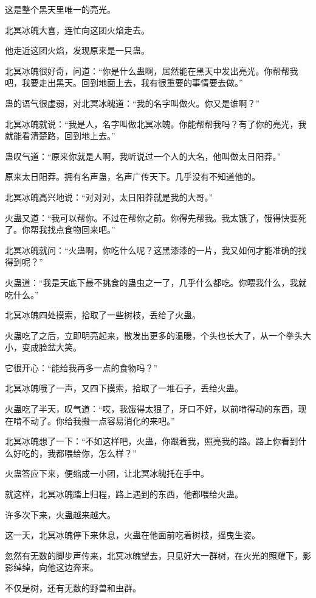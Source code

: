 \begin{this_body}
这是整个黑天里唯一的亮光。

北冥冰魄大喜，连忙向这团火焰走去。

他走近这团火焰，发现原来是一只蛊。

北冥冰魄很好奇，问道：“你是什么蛊啊，居然能在黑天中发出亮光。你帮帮我吧，我要走出黑天。回到地面上去，我有很重要的事情要去做。”

蛊的语气很虚弱，对北冥冰魄道：“我的名字叫做火。你又是谁啊？”

北冥冰魄就说：“我是人，名字叫做北冥冰魄。你能帮帮我吗？有了你的亮光，我就能看清楚路，回到地上去。”

蛊叹气道：“原来你就是人啊，我听说过一个人的大名，他叫做太日阳莽。”

原来太日阳莽。拥有名声蛊，名声广传天下。几乎没有不知道他的。

北冥冰魄高兴地说：“对对对，太日阳莽就是我的大哥。”

火蛊又道：“我可以帮你。不过在帮你之前。你得先帮我。我太饿了，饿得快要死了。你帮我找点食物回来吧。”

北冥冰魄就问：“火蛊啊，你吃什么呢？这黑漆漆的一片，我又如何才能准确的找得到呢？”

火蛊道：“我是天底下最不挑食的蛊虫之一了，几乎什么都吃。你喂我什么，我就吃什么。”

北冥冰魄四处摸索，拾取了一些树枝，丢给了火蛊。

火蛊吃了之后，立即明亮起来，散发出更多的温暖，个头也长大了，从一个拳头大小，变成脸盆大笑。

它很开心：“能给我再多一点的食物吗？”

北冥冰魄哦了一声，又四下摸索，拾取了一堆石子，丢给火蛊。

火蛊吃了半天，叹气道：“哎，我饿得太狠了，牙口不好，以前啃得动的东西，现在啃不动了。你给我搬一点容易消化的来吧。”

北冥冰魄想了一下：“不如这样吧，火蛊，你跟着我，照亮我的路。路上你看到什么好吃的，我都喂给你，怎么样？”

火蛊答应下来，便缩成一小团，让北冥冰魄托在手中。

就这样，北冥冰魄踏上归程，路上遇到的东西，他都喂给火蛊。

许多次下来，火蛊越来越大。

这一天，北冥冰魄停下来休息，火蛊在他面前吃着树枝，摇曳生姿。

忽然有无数的脚步声传来，北冥冰魄望去，只见好大一群树，在火光的照耀下，影影绰绰，向他这边奔来。

不仅是树，还有无数的野兽和虫群。


\end{this_body}
